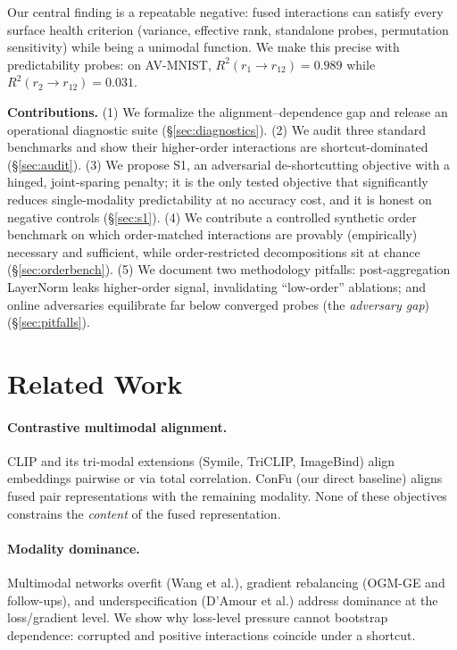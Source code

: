 \documentclass[10pt,twocolumn]{article}
\newcommand{\rIA}{r_{12}}
\newcommand{\ra}{r_1}
\newcommand{\rb}{r_2}
\begin{document}
Our central finding is a repeatable negative: fused interactions can satisfy every surface health
criterion (variance, effective rank, standalone probes, permutation sensitivity) while being a
unimodal function. We make this precise with predictability probes: on AV-MNIST,
$R^2(\ra\!\to\!\rIA)=0.989$ while $R^2(\rb\!\to\!\rIA)=0.031$.

\textbf{Contributions.}
(1) We formalize the alignment--dependence gap and release an operational diagnostic suite
(\S\ref{sec:diagnostics}). (2) We audit three standard benchmarks and show their higher-order
interactions are shortcut-dominated (\S\ref{sec:audit}). (3) We propose S1, an adversarial
de-shortcutting objective with a hinged, joint-sparing penalty; it is the only tested objective
that significantly reduces single-modality predictability at no accuracy cost, and it is honest
on negative controls (\S\ref{sec:s1}). (4) We contribute a controlled synthetic order benchmark
on which order-matched interactions are provably (empirically) necessary and sufficient, while
order-restricted decompositions sit at chance (\S\ref{sec:orderbench}). (5) We document two
methodology pitfalls: post-aggregation LayerNorm leaks higher-order signal, invalidating
``low-order'' ablations; and online adversaries equilibrate far below converged probes (the
\emph{adversary gap}) (\S\ref{sec:pitfalls}).

\section{Related Work}
\paragraph{Contrastive multimodal alignment.} CLIP and its tri-modal extensions (Symile, TriCLIP,
ImageBind) align embeddings pairwise or via total correlation. ConFu (our direct baseline) aligns
fused pair representations with the remaining modality. None of these objectives constrains the
\emph{content} of the fused representation.
\paragraph{Modality dominance.} Multimodal networks overfit (Wang et al.), gradient rebalancing
(OGM-GE and follow-ups), and underspecification (D'Amour et al.) address dominance at the
loss/gradient level. We show why loss-level pressure cannot bootstrap dependence: corrupted and
positive interactions coincide under a shortcut.
\end{document}
